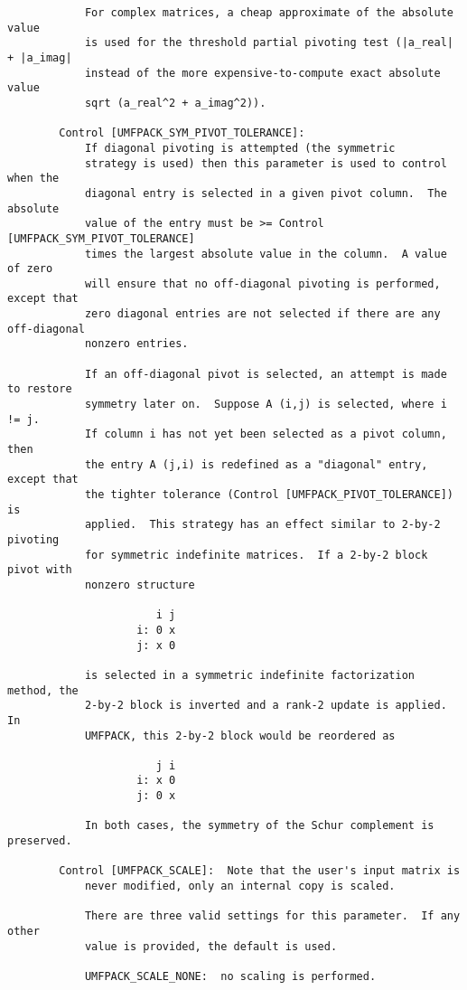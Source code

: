 \documentclass[11pt]{article}
\begin{document}
{\begin{verbatim}
            For complex matrices, a cheap approximate of the absolute value
            is used for the threshold partial pivoting test (|a_real| + |a_imag|
            instead of the more expensive-to-compute exact absolute value
            sqrt (a_real^2 + a_imag^2)).

        Control [UMFPACK_SYM_PIVOT_TOLERANCE]:
            If diagonal pivoting is attempted (the symmetric
            strategy is used) then this parameter is used to control when the
            diagonal entry is selected in a given pivot column.  The absolute
            value of the entry must be >= Control [UMFPACK_SYM_PIVOT_TOLERANCE]
            times the largest absolute value in the column.  A value of zero
            will ensure that no off-diagonal pivoting is performed, except that
            zero diagonal entries are not selected if there are any off-diagonal
            nonzero entries.

            If an off-diagonal pivot is selected, an attempt is made to restore
            symmetry later on.  Suppose A (i,j) is selected, where i != j.
            If column i has not yet been selected as a pivot column, then
            the entry A (j,i) is redefined as a "diagonal" entry, except that
            the tighter tolerance (Control [UMFPACK_PIVOT_TOLERANCE]) is
            applied.  This strategy has an effect similar to 2-by-2 pivoting
            for symmetric indefinite matrices.  If a 2-by-2 block pivot with
            nonzero structure

                       i j
                    i: 0 x
                    j: x 0

            is selected in a symmetric indefinite factorization method, the
            2-by-2 block is inverted and a rank-2 update is applied.  In
            UMFPACK, this 2-by-2 block would be reordered as

                       j i
                    i: x 0
                    j: 0 x

            In both cases, the symmetry of the Schur complement is preserved.

        Control [UMFPACK_SCALE]:  Note that the user's input matrix is
            never modified, only an internal copy is scaled.

            There are three valid settings for this parameter.  If any other
            value is provided, the default is used.

            UMFPACK_SCALE_NONE:  no scaling is performed.


\end{verbatim}}
\end{document}
